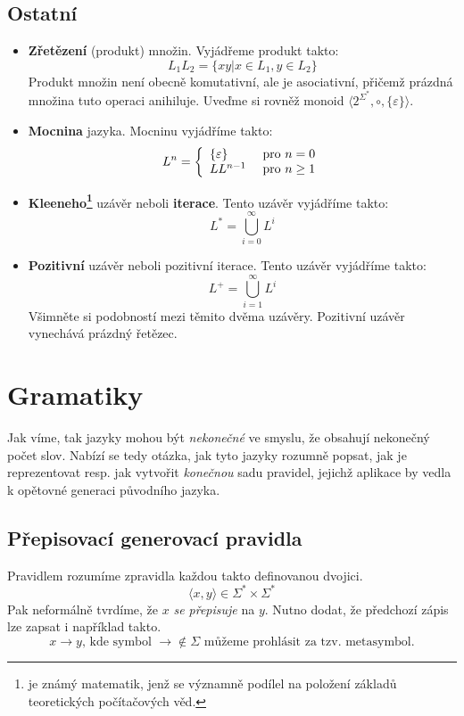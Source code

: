 \documentclass[10pt, a4paper, titlepage]{article}
\theoremstyle{note}
\begin{document}
\subsection{Ostatní}
\begin{itemize}
\item
\textbf{Zřetězení} (produkt) množin. Vyjádřeme produkt takto:
$$
L_{1}L_{2} = \lbrace xy | x \in L_{1}, y \in L_{2} \rbrace
$$
Produkt množin není obecně komutativní, ale je asociativní, přičemž prázdná množina tuto operaci anihiluje.
Uveďme si rovněž monoid $\langle 2^{\Sigma^{*}}, \circ, \lbrace \varepsilon \rbrace \rangle$.

\item
\textbf{Mocnina} jazyka. Mocninu vyjádříme takto:
$$
L^{n} = \left \lbrace
\begin{array}{l l}
\lbrace \varepsilon \rbrace & \text{ pro } n = 0 \\
LL^{n-1} & \text{ pro } n \geq 1 \\
\end{array}
\right.
$$

\item
\textbf{Kleeneho\footnote{ je známý matematik, jenž se významně podílel na položení základů teoretických počítačových věd.}} uzávěr neboli \textbf{iterace}. Tento uzávěr vyjádříme takto:
$$
L^{*} = \bigcup_{i = 0}^{\infty} L^{i}
$$

\item
\textbf{Pozitivní} uzávěr neboli pozitivní iterace. Tento uzávěr vyjádříme takto:
$$
L^{+} = \bigcup_{i = 1}^{\infty} L^{i}
$$
Všimněte si podobností mezi těmito dvěma uzávěry. Pozitivní uzávěr vynechává prázdný řetězec.

\end{itemize}

\section{Gramatiky}
Jak víme, tak jazyky mohou být \emph{nekonečné} ve smyslu, že obsahují nekonečný počet slov.
Nabízí se tedy otázka, jak tyto jazyky rozumně popsat, jak je reprezentovat resp. jak vytvořit \emph{konečnou}
sadu pravidel, jejichž aplikace by vedla k opětovné generaci původního jazyka.

\subsection{Přepisovací generovací pravidla}
Pravidlem rozumíme zpravidla každou takto definovanou dvojici.
$$
\langle x,y \rangle \in \Sigma^{*} \times \Sigma^{*}
$$
Pak neformálně tvrdíme, že $x$ \emph{se přepisuje} na $y$.
Nutno dodat, že předchozí zápis lze zapsat i například takto.
$$
x \rightarrow y\text{, kde symbol } \rightarrow \notin \Sigma \text{ můžeme prohlásit za tzv. metasymbol.}
$$
\end{document}
